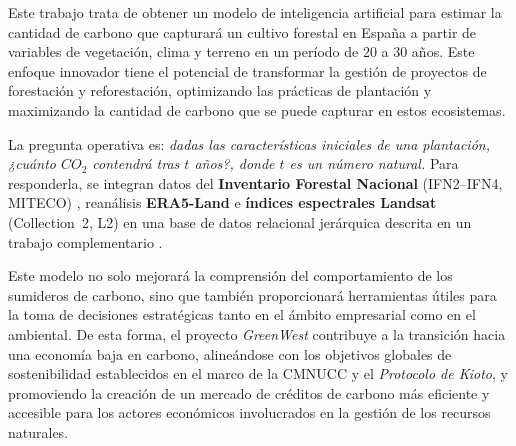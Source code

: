 Este trabajo trata de obtener un modelo de inteligencia artificial para estimar la cantidad de carbono que capturará un cultivo forestal en España a partir de variables de vegetación, clima y terreno en un período de 20 a 30 años. Este enfoque innovador tiene el potencial de transformar la gestión de proyectos de forestación y reforestación, optimizando las prácticas de plantación y maximizando la cantidad de carbono que se puede capturar en estos ecosistemas. 

La pregunta operativa es: \emph{dadas las características iniciales de una plantación, ¿cuánto \(CO_2\) contendrá tras \(t\) años?, donde \(t\) es un número natural.} Para responderla, se integran datos del \textbf{Inventario Forestal Nacional} (IFN2–IFN4, MITECO) \cite{ifn}, reanálisis \textbf{ERA5-Land} \cite{era5land} e \textbf{índices espectrales Landsat} (Collection~2, L2) \cite{landsatc2} en una base de datos relacional jerárquica descrita en un trabajo complementario \cite{greenwestdb}.

Este modelo no solo mejorará la comprensión del comportamiento de los sumideros de carbono, sino que también proporcionará herramientas útiles para la toma de decisiones estratégicas tanto en el ámbito empresarial como en el ambiental. De esta forma, el proyecto \textit{GreenWest} contribuye a la transición hacia una economía baja en carbono, alineándose con los objetivos globales de sostenibilidad establecidos en el marco de la CMNUCC y el \textit{Protocolo de Kioto}, y promoviendo la creación de un mercado de créditos de carbono más eficiente y accesible para los actores económicos involucrados en la gestión de los recursos naturales.

